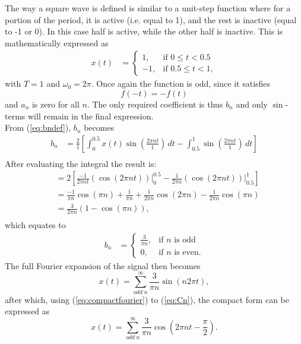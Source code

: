 \documentclass[a4paper, onecolumn, 12pt]{IEEEtran}
\begin{document}
The way a square wave is defined is similar to a unit-step function where for a portion of the period, it is active (i.e. equal to 1), and the rest is inactive (equal to -1 or 0). In this case half is active, while the other half is inactive. This is mathematically expressed as
\begin{align}
    x(t) &= \begin{cases}
    1, & \text{if } 0 \leq t < 0.5 \\
   -1, & \text{if } 0.5 \leq t < 1,
   \end{cases} 
\end{align}
with $T = 1$ and $\omega_0 = 2\pi$. Once again the function is odd, since it satisfies
\begin{equation}
    f(-t) = -f(t)
\end{equation}
and $a_n$ is zero for all $n$. The only required coefficient is thus $b_n$ and only $\sin$-terms will remain in the final expression.\\
From (\ref{eq:bndef}), $b_n$ becomes
\begin{align}
    b_n &= \frac{2}{1} \left[ \int_{0}^{0.5} x(t) \sin \left( \frac{2\pi n t}{1} \right) \, dt
- \int_{0.5}^{1} \sin \left( \frac{2\pi n t}{1} \right) \, dt \right] \nonumber\\
\end{align}
After evaluating the integral the result is:
\begin{align}
 &= 2 \left[ \frac{-1}{2 \pi n t} (\cos (2 \pi n t)) \bigg|_0^{0.5} - \frac{1}{2 \pi n} (\cos (2 \pi n t)) \bigg|_{0.5}^{1} \right] \nonumber\\
 &= \frac{-1}{\pi n} \cos (\pi n) + \frac{1}{\pi n} + \frac{1}{2 \pi n} \cos (2 \pi n) - \frac{1}{2 \pi n} \cos (\pi n)\nonumber\\
 &= \frac{3}{2 \pi n} (1 - \cos (\pi n)), \nonumber \\
\end{align}
which equates to
\begin{align}
    b_n &= \begin{cases}
    \frac{3}{\pi n}, &\text{if $n$ is odd } \\
    0, &\text{if $n$ is even}.
\end{cases}
\end{align}
The full Fourier expansion of the signal then becomes
\begin{equation}
\label{eq:square50_fourier}
    x(t) = \sum_{odd\; n}^{\infty}\frac{3}{\pi n} \sin (n 2 \pi t),
\end{equation}
after which, using (\ref{eq:compactfourier}) to (\ref{eq:Cn}), the compact form can be expressed as
\begin{equation}
    x(t)= \sum_{odd\;n}^{\infty}\frac{3}{\pi n} \cos \left(2 \pi n t - \frac{\pi}{2}\right).
\end{equation}
\end{document}
